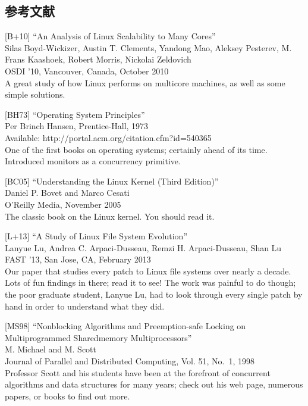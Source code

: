 \hypertarget{ux53c2ux8003ux6587ux732e-18}{%
\subsection*{参考文献}\label{ux53c2ux8003ux6587ux732e-18}}

{[}B+10{]} ``An Analysis of Linux Scalability to Many Cores''\\
Silas Boyd-Wickizer, Austin T. Clements, Yandong Mao, Aleksey Pesterev,
M. Frans Kaashoek, Robert Morris, Nickolai Zeldovich\\
OSDI '10, Vancouver, Canada, October 2010\\
A great study of how Linux performs on multicore machines, as well as
some simple solutions.

{[}BH73{]} ``Operating System Principles''\\
Per Brinch Hansen, Prentice-Hall, 1973\\
Available: http://portal.acm.org/citation.cfm?id=540365\\
One of the first books on operating systems; certainly ahead of its
time. Introduced monitors as a concurrency primitive.

{[}BC05{]} ``Understanding the Linux Kernel (Third Edition)''\\
Daniel P. Bovet and Marco Cesati\\
O'Reilly Media, November 2005\\
The classic book on the Linux kernel. You should read it.

{[}L+13{]} ``A Study of Linux File System Evolution''\\
Lanyue Lu, Andrea C. Arpaci-Dusseau, Remzi H. Arpaci-Dusseau, Shan Lu\\
FAST '13, San Jose, CA, February 2013\\
Our paper that studies every patch to Linux file systems over nearly a
decade. Lots of fun findings in there; read it to see! The work was
painful to do though; the poor graduate student, Lanyue Lu, had to look
through every single patch by hand in order to understand what they did.

{[}MS98{]} ``Nonblocking Algorithms and Preemption-safe Locking on
Multiprogrammed Sharedmemory Multiprocessors''\\
M. Michael and M. Scott\\
Journal of Parallel and Distributed Computing, Vol. 51, No.~1, 1998\\
Professor Scott and his students have been at the forefront of
concurrent algorithms and data structures for many years; check out his
web page, numerous papers, or books to find out more.

